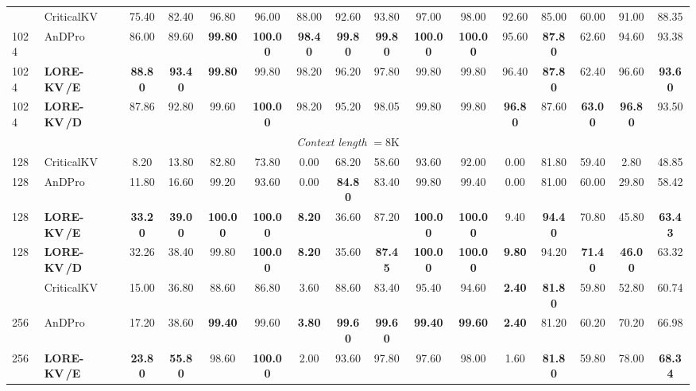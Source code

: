 \documentclass{article} %
\newcommand{\best}[1]{\textcolor{bestblue}{\textbf{#1}}}
\newcommand{\second}[1]{\textcolor{secondorange}{#1}}
\newcommand{\lorekvE}{LORE-KV\,/E}
\newcommand{\lorekvD}{LORE-KV\,/D}
\begin{document}
\begin{table}[p]
{\begin{tabular}{llcccccccccccccc}
\addlinespace[2pt]
1024 & CriticalKV & 75.40 & 82.40 & 96.80 & 96.00 & 88.00 & 92.60 & 93.80 & 97.00 & 98.00 & 92.60 & 85.00 & 60.00 & 91.00 & 88.35 \\
1024 & AnDPro & 86.00 & 89.60 & \best{99.80} & \best{100.00} & \best{98.40} & \best{99.80} & \best{99.80} & \best{100.00} & \best{100.00} & 95.60 & \best{87.80} & \second{62.60} & 94.60 & 93.38 \\
1024 & \textbf{\lorekvE} & \best{88.80} & \best{93.40} & \best{99.80} & \second{99.80} & \second{98.20} & \second{96.20} & 97.80 & \second{99.80} & \second{99.80} & \second{96.40} & \best{87.80} & 62.40 & \second{96.60} & \best{93.60} \\
1024 & \textbf{\lorekvD} & \second{87.86} & \second{92.80} & \second{99.60} & \best{100.00} & \second{98.20} & 95.20 & \second{98.05} & \second{99.80} & \second{99.80} & \best{96.80} & \second{87.60} & \best{63.00} & \best{96.80} & \second{93.50} \\
\midrule
\multicolumn{16}{c}{\textit{Context length} $=8$K} \\
\midrule
128 & CriticalKV & 8.20 & 13.80 & 82.80 & 73.80 & \second{0.00} & \second{68.20} & 58.60 & 93.60 & 92.00 & 0.00 & 81.80 & 59.40 & 2.80 & 48.85 \\
128 & AnDPro & 11.80 & 16.60 & 99.20 & \second{93.60} & \second{0.00} & \best{84.80} & 83.40 & \second{99.80} & \second{99.40} & 0.00 & 81.00 & 60.00 & 29.80 & 58.42 \\
128 & \textbf{\lorekvE} & \best{33.20} & \best{39.00} & \best{100.00} & \best{100.00} & \best{8.20} & 36.60 & \second{87.20} & \best{100.00} & \best{100.00} & \second{9.40} & \best{94.40} & \second{70.80} & \second{45.80} & \best{63.43} \\
128 & \textbf{\lorekvD} & \second{32.26} & \second{38.40} & \second{99.80} & \best{100.00} & \best{8.20} & 35.60 & \best{87.45} & \best{100.00} & \best{100.00} & \best{9.80} & \second{94.20} & \best{71.40} & \best{46.00} & \second{63.32} \\
\addlinespace[2pt]
256 & CriticalKV & 15.00 & 36.80 & 88.60 & 86.80 & \second{3.60} & 88.60 & 83.40 & 95.40 & 94.60 & \best{2.40} & \best{81.80} & 59.80 & 52.80 & 60.74 \\
256 & AnDPro & 17.20 & 38.60 & \best{99.40} & \second{99.60} & \best{3.80} & \best{99.60} & \best{99.60} & \best{99.40} & \best{99.60} & \best{2.40} & 81.20 & \second{60.20} & 70.20 & 66.98 \\
256 & \textbf{\lorekvE} & \best{23.80} & \best{55.80} & \second{98.60} & \best{100.00} & 2.00 & \second{93.60} & 97.80 & \second{97.60} & \second{98.00} & 1.60 & \best{81.80} & 59.80 & \second{78.00} & \best{68.34} \\

\end{tabular}}
\end{table}
\end{document}
